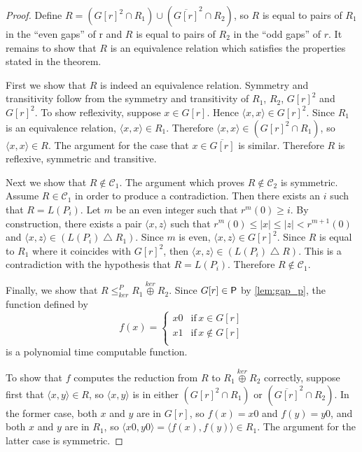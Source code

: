 \documentclass{article}
\theoremstyle{definition} \newtheorem{definition}[definition]{Definition}
\newcommand{\kj}{\overset{ker}{\oplus}} %
\newcommand{\kr}{\leq^{P}_{ker}} %
\newcommand{\symdiff}{\bigtriangleup} %
\newcommand{\pair}[2]{\langle#1,#2\rangle} %
\begin{document}
\begin{proof}
  Define $R=({G[r]}^2\cap R_1)\cup(\overline{G[r]}^2\cap R_2)$, so $R$ is equal
  to pairs of $R_1$ in the ``even gaps'' of r and $R$ is equal to pairs of
  $R_2$ in the ``odd gaps'' of $r$. It remains to show that $R$ is an
  equivalence relation which satisfies the properties stated in the theorem.

  First we show that $R$ is indeed an equivalence relation. Symmetry and
  transitivity follow from the symmetry and transitivity of $R_1$, $R_2$,
  ${G[r]}^2$ and ${G[r]}^2$. To show reflexivity, suppose $x\in G[r]$. Hence
  $\pair{x}{x}\in {G[r]}^2$. Since $R_1$ is an equivalence relation,
  $\pair{x}{x}\in R_1$. Therefore $\pair{x}{x}\in({G[r]}^2\cap R_1)$, so
  $\pair{x}{x}\in R$. The argument for the case that $x\in\overline{G[r]}$ is
  similar. Therefore $R$ is reflexive, symmetric and transitive.

  Next we show that $R\notin\mathcal{C}_1$. The argument which proves
  $R\notin\mathcal{C}_2$ is symmetric. Assume $R\in\mathcal{C}_1$ in order to
  produce a contradiction. Then there exists an $i$ such that $R=L(P_i)$. Let
  $m$ be an even integer such that $r^m(0)\geq i$. By construction, there
  exists a pair $\pair{x}{z}$ such that $r^m(0)\leq|x|\leq|z|<r^{m+1}(0)$ and
  $\pair{x}{z}\in(L(P_i)\symdiff R_1)$. Since $m$ is even, $\pair{x}{z}\in
  {G[r]}^2$. Since $R$ is equal to $R_1$ where it coincides with ${G[r]}^2$,
  then $\pair{x}{z}\in(L(P_i)\symdiff R)$. This is a contradiction with the
  hypothesis that $R=L(P_i)$. Therefore $R\notin\mathcal{C}_1$.

  Finally, we show that $R\kr R_1\kj R_2$. Since $G[r]\in\P$ by
  \autoref{lem:gap_p}, the function defined by
  \begin{displaymath}
    f(x)=
    \begin{cases}
      x0 & \text{if}\, x\in G[r]\\
      x1 & \text{if}\, x\notin G[r]\\
    \end{cases}
  \end{displaymath}
  is a polynomial time computable function.

  To show that $f$ computes the reduction from $R$ to $R_1\kj R_2$ correctly,
  suppose first that $\pair{x}{y}\in R$, so $\pair{x}{y}$ is in either
  $({G[r]}^2\cap R_1)$ or $(\overline{G[r]}^2\cap R_2)$. In the former case,
  both $x$ and $y$ are in $G[r]$, so $f(x)=x0$ and $f(y)=y0$, and both $x$ and
  $y$ are in $R_1$, so $\pair{x0}{y0}=\pair{f(x)}{f(y)}\in R_1$. The argument
  for the latter case is symmetric.


\end{proof}
\end{document}
